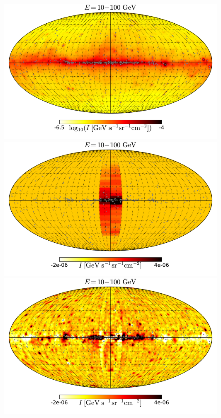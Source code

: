 \begin{figure}[h]
\centering
 \includegraphics[width=\twopic\textwidth]{plots/Mollweide_Boxes_model_0p3-1p0GeV_flux_source_range_1_log.pdf}
\includegraphics[width=\twopic\textwidth]{plots/Mollweide_Boxes_0p3-1p0GeV_flux_source_range_1.pdf}\\
\includegraphics[width=\twopic\textwidth]{plots/Mollweide_Boxes_residual_0p3-1p0GeV_flux_source_range_1.pdf}

\end{figure}
